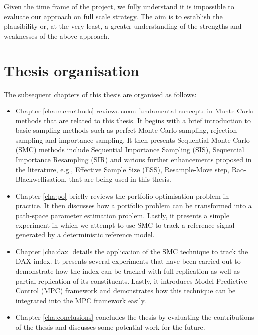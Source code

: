 Given the time frame of the project, we fully understand it is impossible to evaluate our approach on full scale strategy. The aim is to establish the plausibility or, at the very least, a greater understanding of the strengths and weaknesses of the above approach.

\section{Thesis organisation}
The subsequent chapters of this thesis are organised as follows:
\begin{itemize}
\item Chapter \ref{cha:mcmethods} reviews some fundamental concepts in Monte Carlo methods that are related to this thesis. It begins with a brief introduction to basic sampling methods such as perfect Monte Carlo sampling, rejection sampling and importance sampling. It then presents Sequential Monte Carlo (SMC) methods include Sequential Importance Sampling (SIS), Sequential Importance Resampling (SIR) and various further enhancements proposed in the literature, e.g., Effective Sample Size (ESS), Resample-Move step, Rao-Blackwellisation, that are being used in this thesis.
\item Chapter \ref{cha:po} briefly reviews the portfolio optimisation problem in practice. It then discusses how a portfolio problem can be transformed into a path-space parameter estimation problem. Lastly, it presents a simple experiment in which we attempt to use SMC to track a reference signal generated by a deterministic reference model.
\item Chapter \ref{cha:dax} details the application of the SMC technique to track the DAX index. It presents several experiments that have been carried out to demonstrate how the index can be tracked with full replication as well as partial replication of its constituents. Lastly, it introduces Model Predictive Control (MPC) framework and demonstrates how this technique can be integrated into the MPC framework easily.
\item Chapter \ref{cha:conclusions} concludes the thesis by evaluating the contributions of the thesis and discusses some potential work for the future.
\end{itemize}



